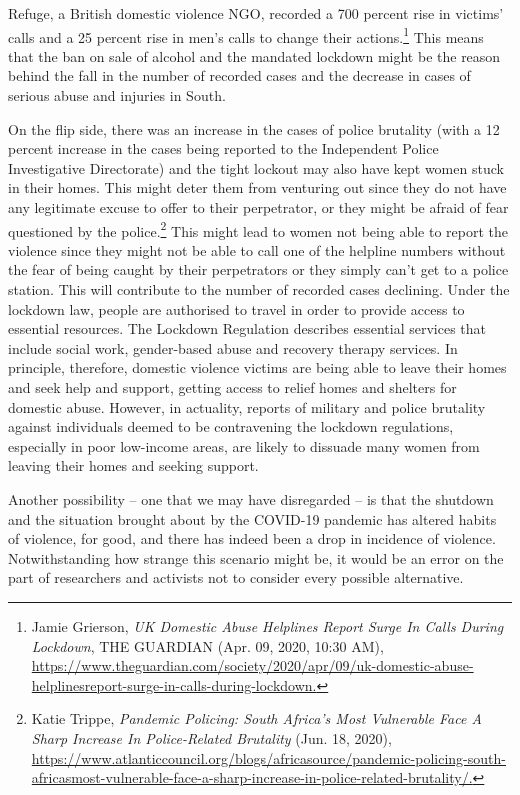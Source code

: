\begin{multicols}{2}
\noi
Refuge, a British domestic violence NGO, recorded a 700 percent rise in victims' calls and a
25 percent rise in men's calls to change their actions.\footnote{Jamie Grierson, \textit{UK Domestic Abuse Helplines Report Surge In Calls During Lockdown}, THE GUARDIAN
(Apr. 09, 2020, 10:30 AM), \url{https://www.theguardian.com/society/2020/apr/09/uk-domestic-abuse-helplinesreport-surge-in-calls-during-lockdown.}} This means that the ban on sale of
alcohol and the mandated lockdown might be the reason behind the fall in the number of
recorded cases and the decrease in cases of serious abuse and injuries in South. 

\noi
On the flip side, there was an increase in the cases of police brutality (with a 12 percent
increase in the cases being reported to the Independent Police Investigative Directorate) and
the tight lockout may also have kept women stuck in their homes. This might deter them from
venturing out since they do not have any legitimate excuse to offer to their perpetrator, or
they might be afraid of fear questioned by the police.\footnote{Katie Trippe, \textit{Pandemic Policing: South Africa’s Most Vulnerable Face A Sharp Increase In Police-Related
Brutality} (Jun. 18, 2020), \url{https://www.atlanticcouncil.org/blogs/africasource/pandemic-policing-south-africasmost-vulnerable-face-a-sharp-increase-in-police-related-brutality/.}} This might lead to women not being
able to report the violence since they might not be able to call one of the helpline numbers
without the fear of being caught by their perpetrators or they simply can't get to a police
station. This will contribute to the number of recorded cases declining. Under the lockdown
law, people are authorised to travel in order to provide access to essential resources. The
Lockdown Regulation describes essential services that include social work, gender-based
abuse and recovery therapy services. In principle, therefore, domestic violence victims are
being able to leave their homes and seek help and support, getting access to relief homes and
shelters for domestic abuse. However, in actuality, reports of military and police brutality
against individuals deemed to be contravening the lockdown regulations, especially in poor
low-income areas, are likely to dissuade many women from leaving their homes and seeking
support.

\noi
Another possibility – one that we may have disregarded – is that the shutdown and the
situation brought about by the COVID-19 pandemic has altered habits of violence, for good,
and there has indeed been a drop in incidence of violence. Notwithstanding how strange this
scenario might be, it would be an error on the part of researchers and activists not to consider
every possible alternative.


\end{multicols}
